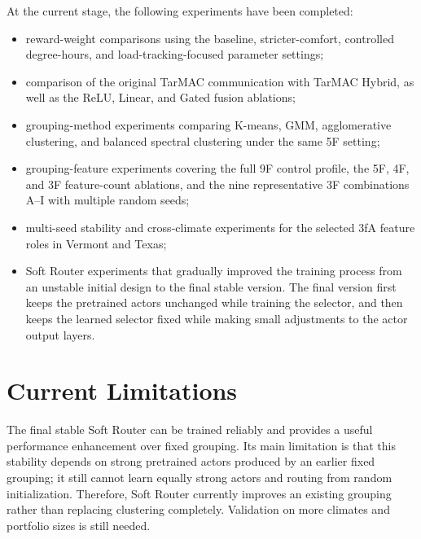 At the current stage, the following experiments have been completed:
\begin{itemize}
  \item reward-weight comparisons using the baseline, stricter-comfort,
  controlled degree-hours, and load-tracking-focused parameter settings;
  \item comparison of the original TarMAC communication with TarMAC Hybrid, as
  well as the ReLU, Linear, and Gated fusion ablations;
  \item grouping-method experiments comparing K-means, GMM, agglomerative
  clustering, and balanced spectral clustering under the same 5F setting;
  \item grouping-feature experiments covering the full 9F control profile, the
  5F, 4F, and 3F feature-count ablations, and the nine representative 3F
  combinations A--I with multiple random seeds;
  \item multi-seed stability and cross-climate experiments for the selected 3fA
  feature roles in Vermont and Texas;
  \item Soft Router experiments that gradually improved the training process from
  an unstable initial design to the final stable version. The final version first
  keeps the pretrained actors unchanged while training the selector, and then
  keeps the learned selector fixed while making small adjustments to the actor
  output layers.
\end{itemize}


\section{Current Limitations}

The final stable Soft Router can be trained reliably and provides a useful
performance enhancement over fixed grouping. Its main limitation is that this
stability depends on strong pretrained actors produced by an earlier fixed
grouping; it still cannot learn equally strong actors and routing from random
initialization. Therefore, Soft Router currently improves an existing grouping
rather than replacing clustering completely. Validation on more climates and
portfolio sizes is still needed.
